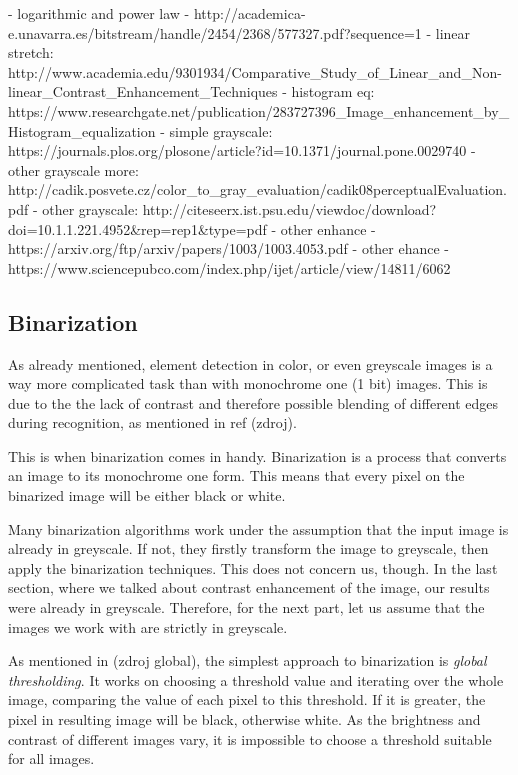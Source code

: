 - logarithmic and power law - http://academica-e.unavarra.es/bitstream/handle/2454/2368/577327.pdf?sequence=1
- linear stretch: http://www.academia.edu/9301934/Comparative_Study_of_Linear_and_Non-linear_Contrast_Enhancement_Techniques
- histogram eq: https://www.researchgate.net/publication/283727396_Image_enhancement_by_Histogram_equalization
- simple grayscale: https://journals.plos.org/plosone/article?id=10.1371/journal.pone.0029740
- other grayscale more: http://cadik.posvete.cz/color_to_gray_evaluation/cadik08perceptualEvaluation.pdf
- other grayscale: http://citeseerx.ist.psu.edu/viewdoc/download?doi=10.1.1.221.4952&rep=rep1&type=pdf
- other enhance - https://arxiv.org/ftp/arxiv/papers/1003/1003.4053.pdf
- other ehance - https://www.sciencepubco.com/index.php/ijet/article/view/14811/6062

\subsection{Binarization}

As already mentioned, element detection in color, or even greyscale images is a way more complicated task than with monochrome one (1 bit) images. This is due to the the lack of contrast and therefore possible blending of different edges during recognition, as mentioned in ref (zdroj).

This is when binarization comes in handy. Binarization is a process that converts an image to its monochrome one form. This means that every pixel on the binarized image will be either black or white.

Many binarization algorithms work under the assumption that the input image is already in greyscale. If not, they firstly transform the image to greyscale, then apply the binarization techniques. This does not concern us, though. In the last section, where we talked about contrast enhancement of the image, our results were already in greyscale. Therefore, for the next part, let us assume that the images we work with are strictly in greyscale.

As mentioned in (zdroj global), the simplest approach to binarization is \emph{global thresholding}. It works on choosing a threshold value and iterating over the whole image, comparing the value of each pixel to this threshold. If it is greater, the pixel in resulting image will be black, otherwise white. As the brightness and contrast of different images vary, it is impossible to choose a threshold suitable for all images.

